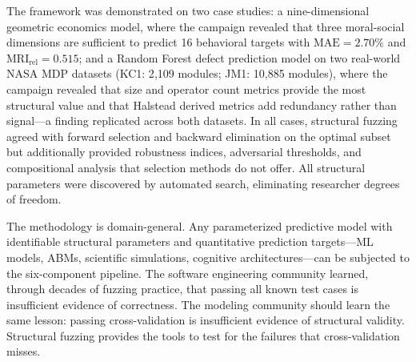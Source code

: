 \documentclass[manuscript,review,anonymous]{acmart}
\newcommand{\MAE}{\mathrm{MAE}}
\newcommand{\MRI}{\mathrm{MRI}}
\begin{document}
The framework was demonstrated on two case studies: a nine-dimensional geometric economics model, where the campaign revealed that three moral-social dimensions are sufficient to predict 16 behavioral targets with $\MAE = 2.70\%$ and $\MRI_{\mathrm{rel}} = 0.515$; and a Random Forest defect prediction model on two real-world NASA MDP datasets (KC1: 2{,}109 modules; JM1: 10{,}885 modules), where the campaign revealed that size and operator count metrics provide the most structural value and that Halstead derived metrics add redundancy rather than signal---a finding replicated across both datasets.
In all cases, structural fuzzing agreed with forward selection and backward elimination on the optimal subset but additionally provided robustness indices, adversarial thresholds, and compositional analysis that selection methods do not offer.
All structural parameters were discovered by automated search, eliminating researcher degrees of freedom.

The methodology is domain-general.
Any parameterized predictive model with identifiable structural parameters and quantitative prediction targets---ML models, ABMs, scientific simulations, cognitive architectures---can be subjected to the six-component pipeline.
The software engineering community learned, through decades of fuzzing practice, that passing all known test cases is insufficient evidence of correctness.
The modeling community should learn the same lesson: passing cross-validation is insufficient evidence of structural validity.
Structural fuzzing provides the tools to test for the failures that cross-validation misses.




\end{document}
